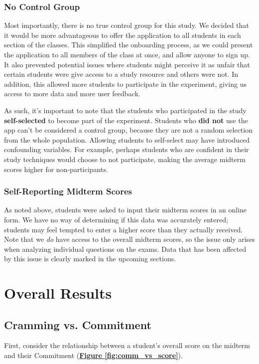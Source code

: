 \subsubsection{No Control Group} 
\par Most importantly, there is no true control group for this study. We decided that it would be more advantageous to offer the application to all students in each section of the classes. This simplified the onboarding process, as we could present the application to all members of the class at once, and allow anyone to sign up. It also prevented potential issues where students might perceive it as unfair that certain students were give access to a study resource and others were not. In addition, this allowed more students to participate in the experiment, giving us access to more data and more user feedback.

\par As such, it's important to note that the students who participated in the study \textbf{self-selected} to become part of the experiment. Students who \textbf{did not} use the app can't be considered a control group, because they are not a random selection from the whole population. Allowing students to self-select may have introduced confounding variables. For example, perhaps students who are confident in their study techniques would choose to not participate, making the average midterm scores higher for non-participants.

\subsubsection{Self-Reporting Midterm Scores}
\par As noted above, students were asked to input their midterm scores in an online form. We have no way of determining if this data was accurately entered; students may feel tempted to enter a higher score than they actually received. Note that we \textit{do} have access to the overall midterm scores, so the issue only arises when analyzing individual questions on the exams. Data that has been affected by this issue is clearly marked in the upcoming sections.

\section{Overall Results}
\subsection{Cramming vs. Commitment}
\par First, consider the relationship between a student's overall score on the midterm and their Commitment (\textbf{\hyperref[fig:comm_vs_score]{Figure \ref*{fig:comm_vs_score}}}). 
 
